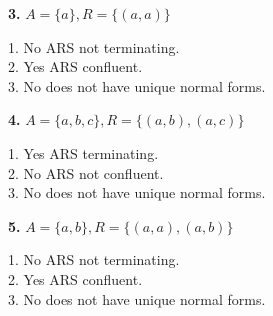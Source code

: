 \documentclass{article}
\theoremstyle{theorem}
\theoremstyle{definition}
\theoremstyle{remark}
\begin{document}
\textbf{3.} \( A = \{a\}, R = \{(a, a)\} \)
\begin{center}
\end{center}
\hspace*{0.6cm}1. No ARS not terminating. \\
\hspace*{0.6cm}2. Yes ARS confluent. \\
\hspace*{0.6cm}3. No does not have unique normal forms.

\textbf{4.} \( A = \{a, b, c\}, R = \{(a, b), (a, c)\} \)
\begin{center}
\end{center}
\hspace*{0.6cm}1. Yes ARS terminating. \\
\hspace*{0.6cm}2. No ARS not confluent. \\
\hspace*{0.6cm}3. No does not have unique normal forms.

\textbf{5.} \( A = \{a, b\}, R = \{(a, a), (a, b)\} \)
\begin{center}
\end{center}
\hspace*{0.6cm}1. No ARS not terminating. \\
\hspace*{0.6cm}2. Yes ARS confluent. \\
\hspace*{0.6cm}3. No does not have unique normal forms.
\end{document}

